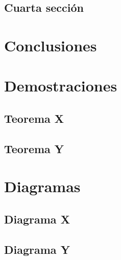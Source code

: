 \documentclass[12pt]{Tesis}
\begin{document}
\section{Cuarta sección}
\lipsum[7-8]

\chapter{Conclusiones}
\lipsum[1-5]

\appendix

\chapter{Demostraciones}

\section{Teorema X}
\lipsum[1-2]

\section{Teorema Y}
\lipsum[1-2]


\chapter{Diagramas}

\section{Diagrama X}
\lipsum[1-2]

\section{Diagrama Y}
\lipsum[1-2]

\backmatter



\nocite{*}
\end{document}
